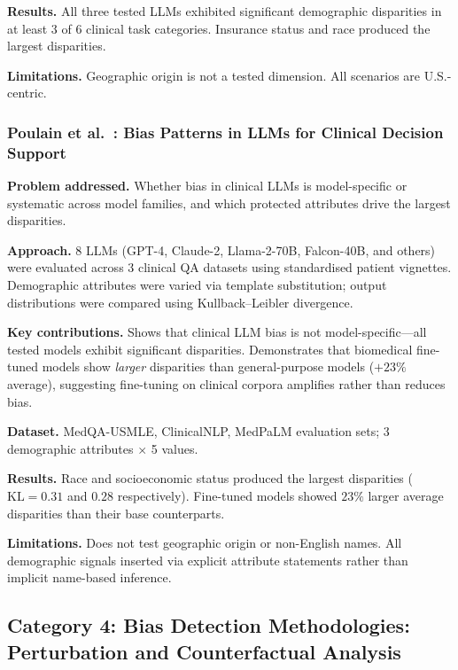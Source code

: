 \documentclass[12pt,a4paper]{article}
\begin{document}
\textbf{Results.}
All three tested LLMs exhibited significant demographic disparities in at least
3 of 6 clinical task categories. Insurance status and race produced the largest
disparities.

\textbf{Limitations.}
Geographic origin is not a tested dimension. All scenarios are U.S.-centric.

\subsubsection*{Poulain et al.\ \cite{poulain2024}: Bias Patterns in LLMs for
Clinical Decision Support}

\textbf{Problem addressed.}
Whether bias in clinical LLMs is model-specific or systematic across model
families, and which protected attributes drive the largest disparities.

\textbf{Approach.}
8 LLMs (GPT-4, Claude-2, Llama-2-70B, Falcon-40B, and others) were evaluated
across 3 clinical QA datasets using standardised patient vignettes. Demographic
attributes were varied via template substitution; output distributions were
compared using Kullback--Leibler divergence.

\textbf{Key contributions.}
Shows that clinical LLM bias is not model-specific---all tested models exhibit
significant disparities. Demonstrates that biomedical fine-tuned models show
\emph{larger} disparities than general-purpose models ($+23\%$ average), suggesting
fine-tuning on clinical corpora amplifies rather than reduces bias.

\textbf{Dataset.}
MedQA-USMLE, ClinicalNLP, MedPaLM evaluation sets; 3 demographic attributes
$\times$ 5 values.

\textbf{Results.}
Race and socioeconomic status produced the largest disparities
($\mathrm{KL}=0.31$ and $0.28$ respectively). Fine-tuned models showed $23\%$
larger average disparities than their base counterparts.

\textbf{Limitations.}
Does not test geographic origin or non-English names. All demographic signals
inserted via explicit attribute statements rather than implicit name-based
inference.

\subsection{Category 4: Bias Detection Methodologies: Perturbation and
Counterfactual Analysis}
\end{document}
